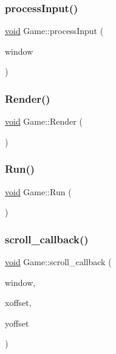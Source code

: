 \mbox{\label{classGame_a600b6bf8efd1874f5b5bdb8fdc48e549}} 
\subsubsection{\texorpdfstring{process\+Input()}{processInput()}}
{\footnotesize\ttfamily \hyperlink{imgui__impl__opengl3__loader_8h_ac668e7cffd9e2e9cfee428b9b2f34fa7}{void} Game\+::process\+Input (\begin{DoxyParamCaption}\item[{G\+L\+F\+Wwindow $\ast$}]{window }\end{DoxyParamCaption})}

\mbox{\label{classGame_a0897730fc9fed789f6c0f11d21a0c14a}} 
\subsubsection{\texorpdfstring{Render()}{Render()}}
{\footnotesize\ttfamily \hyperlink{imgui__impl__opengl3__loader_8h_ac668e7cffd9e2e9cfee428b9b2f34fa7}{void} Game\+::\+Render (\begin{DoxyParamCaption}{ }\end{DoxyParamCaption})}

\mbox{\label{classGame_a96341ca5b54d90adc3ecb3bf0bcd2312}} 
\subsubsection{\texorpdfstring{Run()}{Run()}}
{\footnotesize\ttfamily \hyperlink{imgui__impl__opengl3__loader_8h_ac668e7cffd9e2e9cfee428b9b2f34fa7}{void} Game\+::\+Run (\begin{DoxyParamCaption}{ }\end{DoxyParamCaption})}

\mbox{\label{classGame_ac3931568d19483386124d89aa0e2a762}} 
\subsubsection{\texorpdfstring{scroll\+\_\+callback()}{scroll\_callback()}}
{\footnotesize\ttfamily \hyperlink{imgui__impl__opengl3__loader_8h_ac668e7cffd9e2e9cfee428b9b2f34fa7}{void} Game\+::scroll\+\_\+callback (\begin{DoxyParamCaption}\item[{G\+L\+F\+Wwindow $\ast$}]{window,  }\item[{double}]{xoffset,  }\item[{double}]{yoffset }\end{DoxyParamCaption})}

